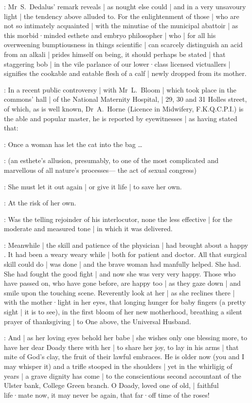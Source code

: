 :
Mr~S.~Dedalus' remark reveals |
as nought else could |
and in a very unsavoury light |
the tendency above alluded to.
For the enlightenment of those |
who are not so intimately acquainted |
with the minutiae of the municipal abattoir |
as this morbid·minded esthete and embryo philosopher |
who |
for all his overweening bumptiousness in things scientific |
can scarcely distinguish an acid from an alkali |
prides himself on being,
it should perhaps be stated |
that staggering bob |
in the vile parlance of our lower·class licensed victuallers |
signifies the cookable and eatable flesh of a calf |
newly dropped from its mother.

:
In a recent public controversy |
with Mr~L.~Bloom |
which took place in the commons' hall |
of the National Maternity Hospital, |
29, 30 and 31 Holles street,
of which,
as is well known,
Dr~A.~Horne
(Licence in Midwifery, F.K.Q.C.P.I.)
is the able and popular master,
he is reported by eyewitnesses |
as having stated that:

\stephen:
Once a woman has let the cat into the bag \dots

:
(an esthete's allusion,
presumably,
to one of the most complicated and marvellous of all nature's processes---%
the act of sexual congress)

\stephen:
She must let it out again |
or give it life |
to save her own.

\Bloom:
At the risk of her own.

:
Was the telling rejoinder of his interlocutor,
none the less effective |
for the moderate and measured tone |
in which it was delivered.


:
Meanwhile |
the skill and patience of the physician |
had brought about a happy .
It had been a weary weary while |
both for patient and doctor.
All that surgical skill could do |
was done |
and the brave woman had manfully helped.
She had.
She had fought the good fight |
and now she was very very happy.
Those who have passed on,
who have gone before,
are happy too |
as they gaze down |
and smile upon the touching scene.
Reverently look at her |
as she reclines there |
with the mother·light in her eyes,
that longing hunger for baby fingers
(a pretty sight |
it is to see),
in the first bloom of her new motherhood,
breathing a silent prayer of thanksgiving |
to One above,
the Universal Husband.

:
And |
as her loving eyes behold her babe |
she wishes only one blessing more,
to have her dear Doady there with her |
to share her joy,
to lay in his arms |
that mite of God's clay,
the fruit of their lawful embraces.
He is older now
(you and I may whisper it)
and a trifle stooped in the shoulders |
yet in the whirligig of years |
a grave dignity has come |
to the conscientious second accountant of the Ulster bank,
College Green branch.
O Doady,
loved one of old, |
faithful life·mate now,
it may never be again,
that far·off time of the roses!


